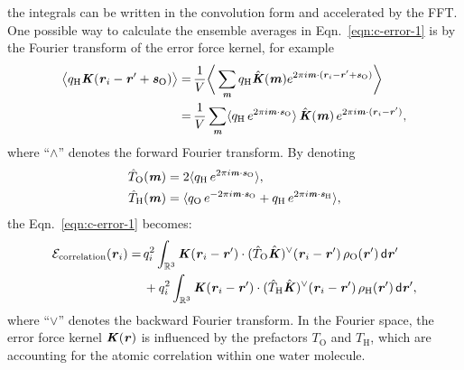 \documentclass[aps,pre,preprint,unsortedaddress]{revtex4}
\renewcommand{\v}[1]{\textbf{\textit{#1}}}
\renewcommand{\d}[1]{\textsf{#1}}
\begin{document}
the integrals can be written in the convolution form and accelerated by the FFT.
One possible way to calculate the ensemble averages in
Eqn.~\eqref{eqn:c-error-1} is by the Fourier transform
of the error force kernel, for example
\begin{align} \nonumber
  \big\langle
  q_{\textrm{H}}\v K(\v r_i - \v r' + \v s_{\textrm{O}})
  \big\rangle 
  =\,&
  \frac1V\bigg\langle
  \sum_{\v m}
  q_{\textrm{H}}\hat{\v K}(\v m)
  e^{2\pi i\v m\cdot(\v r_i - \v r' + \v s_{\textrm{O}})} 
  \bigg\rangle \\\nonumber
  =\,&
  \frac1V\sum_{\v m}
  \langle
  q_{\textrm{H}}\,e^{2\pi i\v m\cdot\v s_{\textrm{O}}}
  \rangle\,
  \hat{\v K}(\v m)\,
  e^{2\pi i\v m\cdot(\v r_i - \v r')},
\end{align}
where ``$\wedge$'' denotes the forward Fourier transform. By denoting
\begin{align}
  \hat T_{\textrm{O}}(\v m)
  &= 
  2\langle
  q_{\textrm{H}}\,e^{2\pi i\v m\cdot\v s_{\textrm{O}}}
  \rangle,\\
  \hat T_{\textrm{H}}(\v m)
  &= 
  \langle
  q_{\textrm{O}}\,e^{-2\pi i\v m\cdot\v s_{\textrm{O}}} +
  q_{\textrm{H}}\,e^{2\pi i\v m\cdot\v s_{\textrm{H}}}
  \rangle,
\end{align}
the Eqn.~\eqref{eqn:c-error-1} becomes:
\begin{align}\nonumber
  \mathcal E_{\textrm{correlation}}(\v r_i)
  =&\,
  q_i^2
  \int_{\mathbb R^3}
  \v K(\v r_i - \v r')\cdot
  (\hat T_{\textrm{O}}\hat{\v K})^{\vee}(\v r_i - \v r')
  \,\rho_{\textrm{O}}(\v r')
  \,\d d\v r' \\\label{eqn:c-error-water}
  & \,+
  q_i^2
  \int_{\mathbb R^3}
  \v K(\v r_i - \v r')\cdot
  (\hat T_{\textrm{H}}\hat{\v K})^{\vee}(\v r_i - \v r')
  \,\rho_{\textrm{H}}(\v r')
  \,\d d\v r',
\end{align}
where ``$\vee$'' denotes the backward Fourier transform.
In the Fourier space, the error force kernel $\v K(\v r)$ is
influenced by the prefactors $T_{\textrm{O}}$ and $T_{\textrm{H}}$,
which are accounting for the atomic correlation within one water
molecule.
\end{document}
